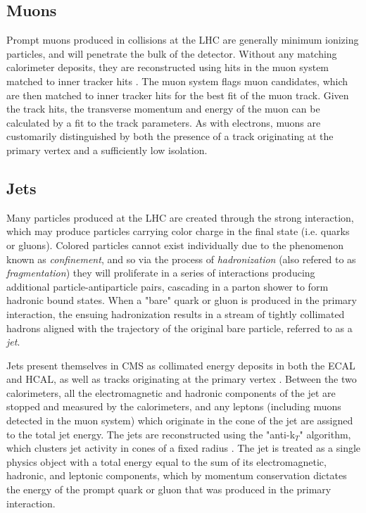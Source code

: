 \subsection{Muons}
\label{subsec:muons}
Prompt muons produced in collisions at the LHC are generally minimum ionizing particles, and will penetrate the bulk of the detector. Without any matching calorimeter deposits, they are reconstructed using hits in the muon system matched to inner tracker hits \cite{Chatrchyan:2009ae}. The muon system flags muon candidates, which are then matched to inner tracker hits for the best fit of the muon track. Given the track hits, the transverse momentum and energy of the muon can be calculated by a fit to the track parameters. As with electrons, muons are customarily distinguished by both the presence of a track originating at the primary vertex and a sufficiently low isolation.

\subsection{Jets}
\label{subsec:jets}
Many particles produced at the LHC are created through the strong interaction, which may produce particles carrying color charge in the final state (i.e. quarks or gluons). Colored particles cannot exist individually due to the phenomenon known as {\it confinement}, and so via the process of {\it hadronization} (also refered to as {\it fragmentation}) they will proliferate in a series of interactions producing additional particle-antiparticle pairs, cascading in a parton shower to form hadronic bound states. When a "bare" quark or gluon is produced in the primary interaction, the ensuing hadronization results in a stream of tightly collimated hadrons aligned with the trajectory of the original bare particle, referred to as a {\it jet}. 

Jets present themselves in CMS as collimated energy deposits in both the ECAL and HCAL, as well as tracks originating at the primary vertex \cite{Schroder:2015czj}. Between the two calorimeters, all the electromagnetic and hadronic components of the jet are stopped and measured by the calorimeters, and any leptons (including muons detected in the muon system) which originate in the cone of the jet are assigned to the total jet energy. The jets are reconstructed using the "anti-k$_T$" algorithm, which clusters jet activity in cones of a fixed radius \cite{Cacciari:2008gp}. The jet is treated as a single physics object with a total energy equal to the sum of its electromagnetic, hadronic, and leptonic components, which by momentum conservation dictates the energy of the prompt quark or gluon that was produced in the primary interaction. 

